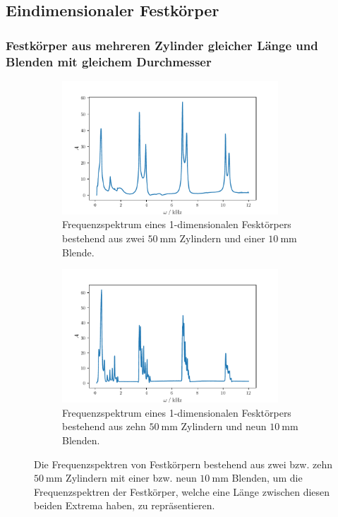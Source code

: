 \subsection{Eindimensionaler Festkörper}
\subsubsection{Festkörper aus mehreren Zylinder gleicher Länge und Blenden mit gleichem Durchmesser}
\label{subsub:dia}
\begin{figure}
    \begin{subfigure}{0.48\textwidth}%
    \centering%
    \includegraphics[height=5cm]{build/2c1b10.pdf}%
    \caption{Frequenzspektrum eines 1-dimensionalen Fesktörpers bestehend aus zwei $\qty{50}{\milli\meter}$ Zylindern und einer $\qty{10}{\milli\meter}$ Blende.}%
    \label{fig:2c1b10}%
    \end{subfigure}%
    \hfill%
    \begin{subfigure}{0.48\textwidth}%
    \centering%
    \includegraphics[height=5cm]{build/10c9b10.pdf}%
    \caption{Frequenzspektrum eines 1-dimensionalen Fesktörpers bestehend aus zehn $\qty{50}{\milli\meter}$ Zylindern und neun $\qty{10}{\milli\meter}$ Blenden.}%
    \label{fig:2c1b}%
    \end{subfigure}%
    \caption{Die Frequenzspektren von Festkörpern bestehend aus zwei bzw. zehn $\qty{50}{\milli\meter}$ Zylindern mit einer bzw. neun $\qty{10}{\milli\meter}$ Blenden, um die 
    Frequenzspektren der Festkörper, welche eine Länge zwischen diesen beiden Extrema haben, zu repräsentieren.}%
    \label{fig:10mm}
\end{figure}%
